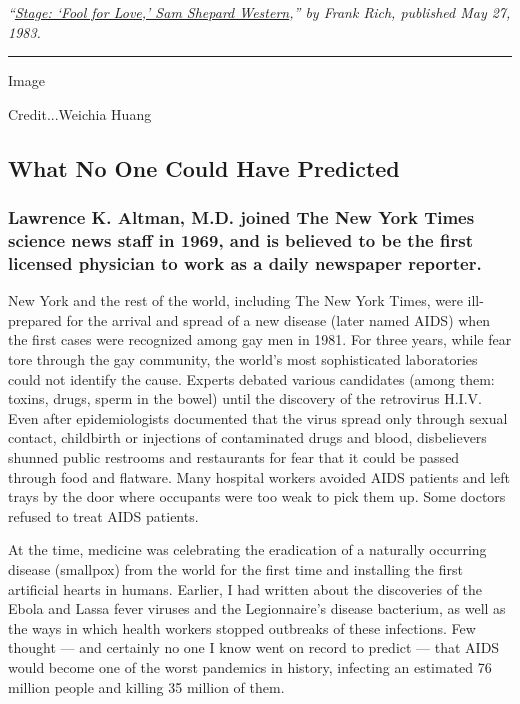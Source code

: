 \emph{``\href{https://www.nytimes.com/1983/05/27/theater/stage-fool-for-love-sam-shepard-western.html}{Stage:
`Fool for Love,' Sam Shepard Western},'' by Frank Rich, published May
27, 1983.}

\begin{center}\rule{0.5\linewidth}{\linethickness}\end{center}

Image

Credit...Weichia Huang

\hypertarget{what-no-one-could-have-predicted}{%
\subsection{What No One Could Have
Predicted}\label{what-no-one-could-have-predicted}}

\hypertarget{lawrence-k-altman-md-joined-the-new-york-times-science-news-staff-in-1969-and-is-believed-to-be-the-first-licensed-physician-to-work-as-a-daily-newspaper-reporter}{%
\subsubsection{Lawrence K. Altman, M.D. joined The New York Times
science news staff in 1969, and is believed to be the first licensed
physician to work as a daily newspaper
reporter.}\label{lawrence-k-altman-md-joined-the-new-york-times-science-news-staff-in-1969-and-is-believed-to-be-the-first-licensed-physician-to-work-as-a-daily-newspaper-reporter}}

New York and the rest of the world, including The New York Times, were
ill-prepared for the arrival and spread of a new disease (later named
AIDS) when the first cases were recognized among gay men in 1981. For
three years, while fear tore through the gay community, the world's most
sophisticated laboratories could not identify the cause. Experts debated
various candidates (among them: toxins, drugs, sperm in the bowel) until
the discovery of the retrovirus H.I.V. Even after epidemiologists
documented that the virus spread only through sexual contact, childbirth
or injections of contaminated drugs and blood, disbelievers shunned
public restrooms and restaurants for fear that it could be passed
through food and flatware. Many hospital workers avoided AIDS patients
and left trays by the door where occupants were too weak to pick them
up. Some doctors refused to treat AIDS patients.

At the time, medicine was celebrating the eradication of a naturally
occurring disease (smallpox) from the world for the first time and
installing the first artificial hearts in humans. Earlier, I had written
about the discoveries of the Ebola and Lassa fever viruses and the
Legionnaire's disease bacterium, as well as the ways in which health
workers stopped outbreaks of these infections. Few thought --- and
certainly no one I know went on record to predict --- that AIDS would
become one of the worst pandemics in history, infecting an estimated 76
million people and killing 35 million of them.

